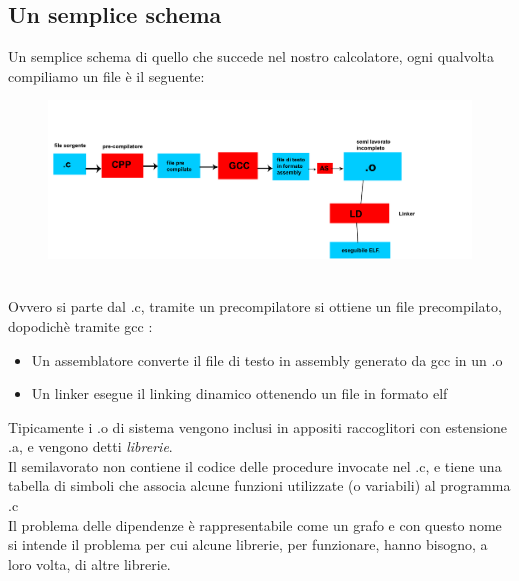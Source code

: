 \documentclass[a4paper,12pt]{article} %
\begin{document}
\subsection{Un semplice schema}
Un semplice schema di quello che succede nel nostro calcolatore, ogni qualvolta compiliamo un file è il seguente:
\begin{figure}[h]
\centering
\includegraphics[width=15.5cm]{schema.pdf}
\label{fig:schema}
\end{figure}\\
Ovvero si parte dal .c, tramite un precompilatore si ottiene un file precompilato, dopodichè tramite gcc :\\
\begin{itemize}
\item Un assemblatore converte il file di testo in assembly generato da gcc in un .o
\item Un linker esegue il linking dinamico ottenendo un file in formato elf
\end{itemize}
Tipicamente i .o di sistema vengono inclusi in appositi raccoglitori con estensione .a, e vengono detti \textit{librerie}.\\
Il semilavorato non contiene il codice delle procedure invocate nel .c, e tiene una tabella di simboli che associa alcune funzioni utilizzate (o variabili) al programma .c\\
Il problema delle dipendenze è rappresentabile come un grafo e con questo nome si intende il problema per cui alcune librerie, per funzionare, hanno bisogno, a loro volta, di altre librerie.\\
\end{document}
